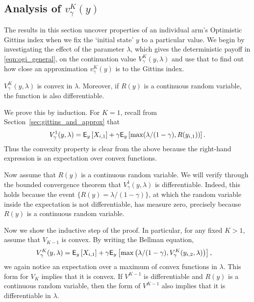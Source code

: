\subsection{Analysis of $v^K_\gamma(y)$}
The results in this section uncover properties of an individual arm's Optimistic Gittins index when we fix the `initial state' $y$ to a particular value. We begin by investigating the effect of the parameter $\lambda$, which gives the deterministic payoff in \eqref{eqn:ogi_general}, on the continuation value $V^K_\gamma(y, \lambda)$ and use that to find out how close an approximation $v^K_\gamma(y)$ is to the Gittins index.
\begin{fact}\label{fact:v_is_convex}
	$V^K_\gamma(y,\lambda)$ is convex in $\lambda$. Moreover, if $R(y)$ is a continuous random variable, the function is also differentiable.
\end{fact}
\begin{myproof}[Proof.]
	We prove this by induction. For $K = 1$, recall from Section~\ref{sec:gittins_and_approx} that
	\begin{align*}
	V^1_\gamma(y, \lambda) = \mathsf{E}_y\left[X_{i,1} \right] +  \gamma \mathsf{E}_y\left[\max(\lambda/(1-\gamma), R(y_{i,1}))\right].
	\end{align*}
	Thus the convexity property is clear from the above because the right-hand expression is an expectation over convex functions. 
	
	Now assume that $R(y)$ is a continuous random variable. We will verify through the bounded convergence theorem that $V^1_\gamma(y, \lambda)$ is differentiable. Indeed, this holds because the event $\{ R(y)= \lambda/(1-\gamma)\}$, at which the random variable inside the expectation is not differentiable, has measure zero, precisely because $R(y)$ is a continuous random variable.
	
	Now we show the inductive step of the proof. In particular, for any fixed $K > 1$, assume that $V_{K-1}$ is convex. By writing the Bellman equation,
	\begin{align*}
	V^K_\gamma(y, \lambda) & = \mathsf{E}_y\left[X_{i,1}\right] + \gamma \mathsf{E}_y\left[\max\left(\lambda/(1-\gamma), V^K_\gamma(y_{i,2}, \lambda)\right) \right],
	\end{align*}
	we again notice an expectation over a maximum of convex functions in $\lambda$. This form for $V_K$ implies that it is convex. If $V^{K-1}$ is differentiable and $R(y)$ is a continuous random variable, then the form of $V^{K-1}$ also implies that it is differentiable in $\lambda$.
\end{myproof}
